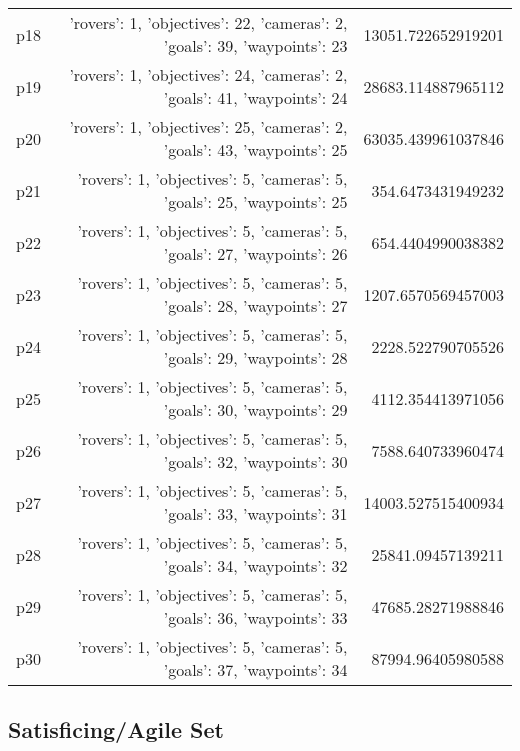 \documentclass{article}
\begin{document}
\begin{center}
\begin{tabular}{r|r|r}
  p18&{'rovers': 1, 'objectives': 22, 'cameras': 2, 'goals': 39, 'waypoints': 23}&13051.722652919201\\
  p19&{'rovers': 1, 'objectives': 24, 'cameras': 2, 'goals': 41, 'waypoints': 24}&28683.114887965112\\
  p20&{'rovers': 1, 'objectives': 25, 'cameras': 2, 'goals': 43, 'waypoints': 25}&63035.439961037846\\
  p21&{'rovers': 1, 'objectives': 5, 'cameras': 5, 'goals': 25, 'waypoints': 25}&354.6473431949232\\
  p22&{'rovers': 1, 'objectives': 5, 'cameras': 5, 'goals': 27, 'waypoints': 26}&654.4404990038382\\
  p23&{'rovers': 1, 'objectives': 5, 'cameras': 5, 'goals': 28, 'waypoints': 27}&1207.6570569457003\\
  p24&{'rovers': 1, 'objectives': 5, 'cameras': 5, 'goals': 29, 'waypoints': 28}&2228.522790705526\\
  p25&{'rovers': 1, 'objectives': 5, 'cameras': 5, 'goals': 30, 'waypoints': 29}&4112.354413971056\\
  p26&{'rovers': 1, 'objectives': 5, 'cameras': 5, 'goals': 32, 'waypoints': 30}&7588.640733960474\\
  p27&{'rovers': 1, 'objectives': 5, 'cameras': 5, 'goals': 33, 'waypoints': 31}&14003.527515400934\\
  p28&{'rovers': 1, 'objectives': 5, 'cameras': 5, 'goals': 34, 'waypoints': 32}&25841.09457139211\\
  p29&{'rovers': 1, 'objectives': 5, 'cameras': 5, 'goals': 36, 'waypoints': 33}&47685.28271988846\\
  p30&{'rovers': 1, 'objectives': 5, 'cameras': 5, 'goals': 37, 'waypoints': 34}&87994.96405980588
                            \end{tabular}
                            \end{center}
                    

                                \subsection*{Satisficing/Agile Set}
                                
\end{document}
